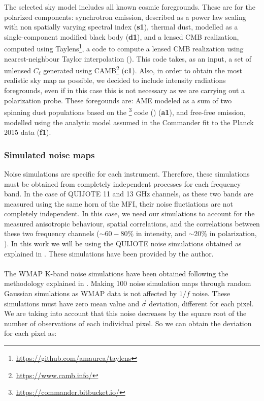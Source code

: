 The selected sky model includes all known cosmic foregrounds. These are for the polarized components: synchrotron emission, described as a power law 
scaling with non spatially varying spectral index (\textbf{s1}), thermal dust, modelled as a single-component modified black body (\textbf{d1}), and a 
lensed CMB realization, computed using Taylens\footnote{\url{https://github.com/amaurea/taylens}}, a code to compute a lensed CMB realization 
using nearest-neighbour Taylor interpolation (\citealp{Taylens}). This code takes, as an input, a set of unlensed $C_{\ell}$ generated using 
CAMB\footnote{\url{https://www.camb.info/}} (\textbf{c1}). Also, in order to obtain the most realistic sky map as possible, we decided to include intensity 
radiations foregrounds, even if in this case this is not necessary as we are carrying out a polarization probe. These foregounds are: AME modeled as 
a sum of two spinning dust populations based on the \commander \footnote{\url{https://commander.bitbucket.io/}} code (\citealp{Planck_2015_commander}) 
(\textbf{a1}), and free-free emission, modelled using the analytic model assumed in the Commander fit to the Planck 2015 data (\textbf{f1}). 


\subsubsection{Simulated noise maps}
\label{sec:noise_simulations}

Noise simulations are specific for each instrument. Therefore, these simulations must be obtained from completely independent processes for each 
frequency band. In the case of QUIJOTE 11 and 13 GHz channels, as these two bands are measured using the same horn of the MFI, their noise fluctiations are not 
completely independent. In this case, we need our simulations to account for the measured anisotropic behaviour, spatial correlations, 
and the correlations between these two frequency channels ($\sim 60 - 80 \%$ in intensity, and $\sim 20 \%$ in polarization, \citealp{QUIJOTE_IV}). 
In this work we will be using the QUIJOTE noise simulations obtained as explained in \citealp{QUIJOTE_IV}. These simulations 
have been provided by the author. 
\paragraph*{}

The WMAP K-band noise simulations have been obtained following the methodology explained in \citealp{WMAP_maps}. Making 100 noise simulation maps through 
random Gaussian simulations as WMAP data is not affected by $1/f$ noise. These simulations must have zero mean value and $\vec{\sigma}$ deviation, 
different for each pixel. We are taking into account that this noise decreases by the square root of the number of observations of each individual pixel. 
So we can obtain the deviation for each pixel as:

